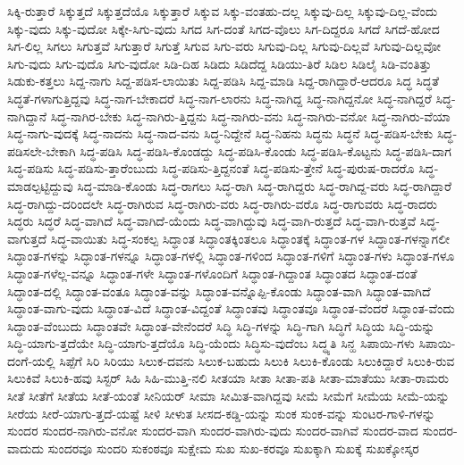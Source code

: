 {ಸಿಕ್ಕಿ-ರುತ್ತಾರೆ
ಸಿಕ್ಕುತ್ತದೆ
ಸಿಕ್ಕುತ್ತದೆಯೊ
ಸಿಕ್ಕುತ್ತಾರೆ
ಸಿಕ್ಕುವ
ಸಿಕ್ಕು-ವಂತಹು-ದಲ್ಲ
ಸಿಕ್ಕುವು-ದಿಲ್ಲ
ಸಿಕ್ಕುವು-ದಿಲ್ಲ-ವೆಂದು
ಸಿಕ್ಕು-ವುದು
ಸಿಕ್ಕು-ವುದೋ
ಸಿಕ್ಕೇ-ಸಿಗು-ವುದು
ಸಿಗದ
ಸಿಗ-ದಂತೆ
ಸಿಗದ-ವೊಲು
ಸಿಗ-ದಿದ್ದರೂ
ಸಿಗದೆ
ಸಿಗದೆ-ಹೋದ
ಸಿಗ-ಲಿಲ್ಲ
ಸಿಗಲು
ಸಿಗುತ್ತವೆ
ಸಿಗುತ್ತಾರೆ
ಸಿಗುತ್ತೆ
ಸಿಗುವ
ಸಿಗು-ವರು
ಸಿಗುವು-ದಿಲ್ಲ
ಸಿಗುವು-ದಿಲ್ಲವೆ
ಸಿಗುವು-ದಿಲ್ಲವೋ
ಸಿಗು-ವುದು
ಸಿಗು-ವುದೊ
ಸಿಗು-ವುದೋ
ಸಿಡಿ-ದಿಹ
ಸಿಡಿದು
ಸಿಡಿದೆದ್ದ
ಸಿಡಿಯು-ತಿರೆ
ಸಿಡಿಲ
ಸಿಡಿಲೈ
ಸಿಡಿ-ವಂತಿತ್ತು
ಸಿಡುಕು-ಕತ್ತಲು
ಸಿದ್ದ-ನಾಗು
ಸಿದ್ದ-ಪಡಿಸ-ಲಾಯಿತು
ಸಿದ್ದ-ಪಡಿಸಿ
ಸಿದ್ದ-ಮಾಡಿ
ಸಿದ್ದ-ರಾಗಿದ್ದಾರೆ-ಆದರೂ
ಸಿದ್ಧ
ಸಿದ್ಧತೆ
ಸಿದ್ಧತೆ-ಗಳಾಗುತ್ತಿದ್ದವು
ಸಿದ್ಧ-ನಾಗ-ಬೇಕಾದರೆ
ಸಿದ್ಧ-ನಾಗ-ಲಾರನು
ಸಿದ್ಧ-ನಾಗಿದ್ದ
ಸಿದ್ಧ-ನಾಗಿದ್ದನೋ
ಸಿದ್ಧ-ನಾಗಿದ್ದರೆ
ಸಿದ್ಧ-ನಾಗಿದ್ದಾನೆ
ಸಿದ್ಧ-ನಾಗಿರ-ಬೇಕು
ಸಿದ್ಧ-ನಾಗಿರು-ತ್ತಿದ್ದನು
ಸಿದ್ಧ-ನಾಗಿರು-ವನು
ಸಿದ್ಧ-ನಾಗಿರು-ವನೋ
ಸಿದ್ಧ-ನಾಗಿರು-ವೆಯಾ
ಸಿದ್ಧ-ನಾಗು-ವುದಕ್ಕೆ
ಸಿದ್ಧ-ನಾದನು
ಸಿದ್ಧ-ನಾದ-ವನು
ಸಿದ್ಧ-ನಿದ್ದೇನೆ
ಸಿದ್ಧ-ನಿಹನು
ಸಿದ್ಧನು
ಸಿದ್ಧನೆ
ಸಿದ್ಧ-ಪಡಿಸ-ಬೇಕು
ಸಿದ್ಧ-ಪಡಿಸಲೇ-ಬೇಕಾಗಿ
ಸಿದ್ಧ-ಪಡಿಸಿ
ಸಿದ್ಧ-ಪಡಿಸಿ-ಕೊಂಡದ್ದು
ಸಿದ್ಧ-ಪಡಿಸಿ-ಕೊಂಡು
ಸಿದ್ಧ-ಪಡಿಸಿ-ಕೊಟ್ಟನು
ಸಿದ್ಧ-ಪಡಿಸಿ-ದಾಗ
ಸಿದ್ಧ-ಪಡಿಸು
ಸಿದ್ಧ-ಪಡಿಸು-ತ್ತಾರೆಂಬುದು
ಸಿದ್ಧ-ಪಡಿಸು-ತ್ತಿದ್ದನಂತೆ
ಸಿದ್ಧ-ಪಡಿಸು-ತ್ತೇನೆ
ಸಿದ್ಧ-ಪುರುಷ-ರಾದರೊ
ಸಿದ್ಧ-ಮಾಡಲ್ಪಟ್ಟಿದ್ದುವು
ಸಿದ್ಧ-ಮಾಡಿ-ಕೊಂಡು
ಸಿದ್ಧ-ರಾಗಲು
ಸಿದ್ಧ-ರಾಗಿ
ಸಿದ್ಧ-ರಾಗಿದ್ದರು
ಸಿದ್ಧ-ರಾಗಿದ್ದ-ವರು
ಸಿದ್ಧ-ರಾಗಿದ್ದಾರೆ
ಸಿದ್ಧ-ರಾಗಿದ್ದು-ದರಿಂದಲೇ
ಸಿದ್ಧ-ರಾಗಿರುವ
ಸಿದ್ಧ-ರಾಗಿರು-ವರು
ಸಿದ್ಧ-ರಾಗಿರು-ವರೊ
ಸಿದ್ಧ-ರಾಗುವರು
ಸಿದ್ಧ-ರಾದರು
ಸಿದ್ಧರು
ಸಿದ್ಧರೆ
ಸಿದ್ಧ-ವಾಗಿದೆ
ಸಿದ್ಧ-ವಾಗಿದೆ-ಯೆಂದು
ಸಿದ್ಧ-ವಾಗಿದ್ದುವು
ಸಿದ್ಧ-ವಾಗಿ-ರುತ್ತದೆ
ಸಿದ್ಧ-ವಾಗಿ-ರುತ್ತವೆ
ಸಿದ್ಧ-ವಾಗುತ್ತದೆ
ಸಿದ್ಧ-ವಾಯಿತು
ಸಿದ್ಧ-ಸಂಕಲ್ಪ
ಸಿದ್ಧಾಂತ
ಸಿದ್ಧಾಂತಕ್ಕಿಂತಲೂ
ಸಿದ್ಧಾಂತಕ್ಕೆ
ಸಿದ್ಧಾಂತ-ಗಳ
ಸಿದ್ಧಾಂತ-ಗಳನ್ನಾಗಲೀ
ಸಿದ್ಧಾಂತ-ಗಳನ್ನು
ಸಿದ್ಧಾಂತ-ಗಳನ್ನೂ
ಸಿದ್ಧಾಂತ-ಗಳಲ್ಲಿ
ಸಿದ್ಧಾಂತ-ಗಳಿಂದ
ಸಿದ್ಧಾಂತ-ಗಳಿಗೆ
ಸಿದ್ಧಾಂತ-ಗಳು
ಸಿದ್ಧಾಂತ-ಗಳೂ
ಸಿದ್ಧಾಂತ-ಗಳೆಲ್ಲ-ವನ್ನೂ
ಸಿದ್ಧಾಂತ-ಗಳೇ
ಸಿದ್ಧಾಂತ-ಗಳೊಂದಿಗೆ
ಸಿದ್ಧಾಂತ-ಗಿದ್ದಾಂತ
ಸಿದ್ಧಾಂತದ
ಸಿದ್ಧಾಂತ-ದಂತೆ
ಸಿದ್ಧಾಂತ-ದಲ್ಲಿ
ಸಿದ್ಧಾಂತ-ವಂತೂ
ಸಿದ್ಧಾಂತ-ವನ್ನು
ಸಿದ್ಧಾಂತ-ವನ್ನೊಪ್ಪಿ-ಕೊಂಡು
ಸಿದ್ಧಾಂತ-ವಾಗಿ
ಸಿದ್ಧಾಂತ-ವಾಗಿದೆ
ಸಿದ್ಧಾಂತ-ವಾಗು-ವುದು
ಸಿದ್ಧಾಂತ-ವಿದೆ
ಸಿದ್ಧಾಂತ-ವಿದ್ದಂತೆ
ಸಿದ್ಧಾಂತವು
ಸಿದ್ಧಾಂತವೂ
ಸಿದ್ಧಾಂತ-ವೆಂದರೆ
ಸಿದ್ಧಾಂತ-ವೆಂದು
ಸಿದ್ಧಾಂತ-ವೆಂಬುದು
ಸಿದ್ಧಾಂತವೇ
ಸಿದ್ಧಾಂತ-ವೇನೆಂದರೆ
ಸಿದ್ಧಿ
ಸಿದ್ಧಿ-ಗಳನ್ನು
ಸಿದ್ಧಿ-ಗಾಗಿ
ಸಿದ್ಧಿಗೆ
ಸಿದ್ಧಿಯ
ಸಿದ್ಧಿ-ಯನ್ನು
ಸಿದ್ಧಿ-ಯಾಗು-ತ್ತದೆಯೇ
ಸಿದ್ಧಿ-ಯಾಗು-ತ್ತದೆಯೊ
ಸಿದ್ಧಿ-ಯೆಂದು
ಸಿದ್ಧಿಸು-ವುದೆಂಬ
ಸಿದ್ಧ್ಯತಿ
ಸಿನ್ಹ
ಸಿಪಾಯಿ-ಗಳು
ಸಿಪಾಯಿ-ದಂಗೆ-ಯಲ್ಲಿ
ಸಿಪ್ಪೆಗೆ
ಸಿರಿ
ಸಿರಿಯು
ಸಿಲುಕ-ದವನು
ಸಿಲುಕ-ಬಹುದು
ಸಿಲುಕಿ
ಸಿಲುಕಿ-ಕೊಂಡು
ಸಿಲುಕಿದ್ದಾರೆ
ಸಿಲುಕಿ-ರುವ
ಸಿಲುಕಿವೆ
ಸಿಲುಕಿ-ಹವು
ಸಿಸ್ಟರ್
ಸಿಹಿ
ಸಿಹಿ-ಮುತ್ತಿ-ನಲಿ
ಸೀತಯಾ
ಸೀತಾ
ಸೀತಾ-ಪತಿ
ಸೀತಾ-ಮಾತೆಯು
ಸೀತಾ-ರಾಮರು
ಸೀತೆ
ಸೀತೆಗೆ
ಸೀತೆಯ
ಸೀತೆ-ಯಂತೆ
ಸೀನಿಯರ್
ಸೀಮಾ
ಸೀಮಿತ-ವಾಗಿದ್ದವು
ಸೀಮೆ
ಸೀಮೆಗೆ
ಸೀಮೆಯ
ಸೀಮೆ-ಯನ್ನು
ಸೀರೆಯ
ಸೀರೆ-ಯಾಗು-ತ್ತದೆ-ಯಷ್ಟೆ
ಸೀಳಿ
ಸೀಳುತ
ಸೀಸದ-ಕಡ್ಡಿ-ಯನ್ನು
ಸುಂಕ
ಸುಂಕ-ವನ್ನು
ಸುಂಟರ-ಗಾಳಿ-ಗಳನ್ನು
ಸುಂದರ
ಸುಂದರ-ನಾಗಿರು-ವನೋ
ಸುಂದರ-ವಾಗಿ
ಸುಂದರ-ವಾಗಿರು-ವುದು
ಸುಂದರ-ವಾಗಿವೆ
ಸುಂದರ-ವಾದ
ಸುಂದರ-ವಾದುದು
ಸುಂದರವೂ
ಸುಂದರಿ
ಸುಕಂಠವೂ
ಸುಕ್ಷೇಮ
ಸುಖ
ಸುಖ-ಕರವೂ
ಸುಖಕ್ಕಾಗಿ
ಸುಖಕ್ಕೆ
ಸುಖಕ್ಕೋಸ್ಕರ
}
